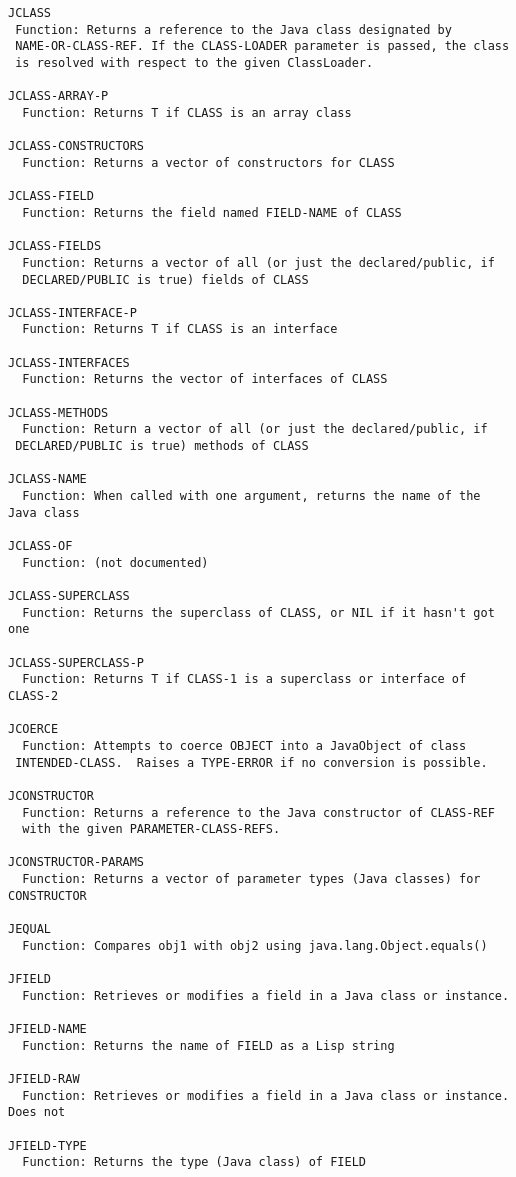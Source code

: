 \begin{verbatim}
JCLASS
 Function: Returns a reference to the Java class designated by
 NAME-OR-CLASS-REF. If the CLASS-LOADER parameter is passed, the class
 is resolved with respect to the given ClassLoader.

JCLASS-ARRAY-P
  Function: Returns T if CLASS is an array class

JCLASS-CONSTRUCTORS
  Function: Returns a vector of constructors for CLASS

JCLASS-FIELD
  Function: Returns the field named FIELD-NAME of CLASS

JCLASS-FIELDS
  Function: Returns a vector of all (or just the declared/public, if
  DECLARED/PUBLIC is true) fields of CLASS

JCLASS-INTERFACE-P
  Function: Returns T if CLASS is an interface

JCLASS-INTERFACES
  Function: Returns the vector of interfaces of CLASS

JCLASS-METHODS
  Function: Return a vector of all (or just the declared/public, if
 DECLARED/PUBLIC is true) methods of CLASS

JCLASS-NAME
  Function: When called with one argument, returns the name of the Java class

JCLASS-OF
  Function: (not documented)

JCLASS-SUPERCLASS
  Function: Returns the superclass of CLASS, or NIL if it hasn't got one

JCLASS-SUPERCLASS-P
  Function: Returns T if CLASS-1 is a superclass or interface of CLASS-2

JCOERCE
  Function: Attempts to coerce OBJECT into a JavaObject of class
 INTENDED-CLASS.  Raises a TYPE-ERROR if no conversion is possible.

JCONSTRUCTOR
  Function: Returns a reference to the Java constructor of CLASS-REF
  with the given PARAMETER-CLASS-REFS.

JCONSTRUCTOR-PARAMS
  Function: Returns a vector of parameter types (Java classes) for CONSTRUCTOR

JEQUAL
  Function: Compares obj1 with obj2 using java.lang.Object.equals()

JFIELD
  Function: Retrieves or modifies a field in a Java class or instance.

JFIELD-NAME
  Function: Returns the name of FIELD as a Lisp string

JFIELD-RAW
  Function: Retrieves or modifies a field in a Java class or instance. Does not

JFIELD-TYPE
  Function: Returns the type (Java class) of FIELD


\end{verbatim}
